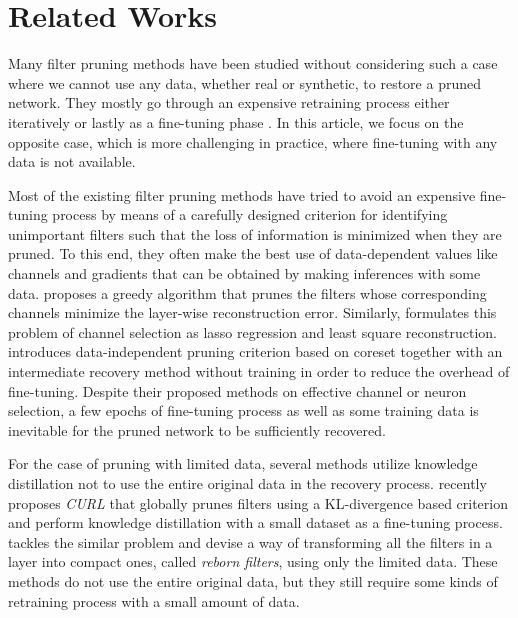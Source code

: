 \section{Related Works} \label{sec:related}
Many filter pruning methods have been studied without considering such a case where we cannot use any data, whether real or synthetic, to restore a pruned network. They mostly go through an expensive retraining process either iteratively \cite{Soft,FPGM,Dynamic,ZhangF24} or lastly as a fine-tuning phase \cite{GlobalRanking,Importance,NISP}. In this article, we focus on the opposite case, which is more challenging in practice, where fine-tuning with any data is not available.

Most of the existing filter pruning methods have tried to avoid an expensive fine-tuning process by means of a carefully designed criterion for identifying unimportant filters such that the loss of information is minimized when they are pruned. To this end, they often make the best use of data-dependent values like channels and gradients that can be obtained by making inferences with some data. \cite{Thinet} proposes a greedy algorithm that prunes the filters whose corresponding channels minimize the layer-wise reconstruction error. Similarly, \cite{Lasso} formulates this problem of channel selection as lasso regression and least square reconstruction.  \cite{CoreSet_ICLR} introduces data-independent pruning criterion based on coreset together with an intermediate recovery method without training in order to reduce the overhead of fine-tuning. Despite their proposed methods on effective channel or neuron selection, a few epochs of fine-tuning process as well as some training data is inevitable for the pruned network to be sufficiently recovered. 


For the case of pruning with limited data, several methods \cite{CURL,Reborn} utilize knowledge distillation \cite{Knowledge_Distilation} not to use the entire original data in the recovery process. \cite{CURL} recently proposes \textit{CURL} that globally prunes filters using a KL-divergence based criterion and perform knowledge distillation with a small dataset as a fine-tuning process. \cite{Reborn} tackles the similar problem and devise a way of transforming all the filters in a layer into compact ones, called \textit{reborn filters}, using only the limited data. These methods do not use the entire original data, but they still require some kinds of retraining process with a small amount of data. 

